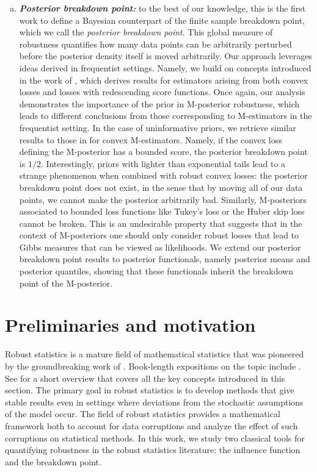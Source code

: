 \documentclass[11pt, oneside]{amsart}
\theoremstyle{definition}   %
\begin{document}
\begin{enumerate}[(a)]
%
    \item 
\textbf{\emph{Posterior breakdown point:}} to the best of our knowledge, this is the first work to define a Bayesian counterpart of the finite sample breakdown point, which we call the \emph{posterior breakdown point}.  This global  measure of robustness quantifies how many data points can be arbitrarily perturbed before the posterior density itself is moved arbitrarily.  Our approach leverages ideas derived in frequentist settings.  Namely, we build on concepts introduced in the work of \cite{huber1984}, which derives results for estimators arising from both convex losses and losses with redescending score functions.  
Once again, our analysis demonstrates the importance of the prior in M-posterior robustness, which leads to different conclusions from those  corresponding to M-estimators in the frequentist setting.  In the case of uninformative priors, we retrieve similar results to those in \cite{donoho:huber1983} for convex M-estimators.  Namely, if the convex loss defining the M-posterior has a bounded score, the posterior breakdown point is $1/2$.   Interestingly, priors with lighter than exponential tails lead to a strange phenomenon when combined with robust convex losses: the posterior breakdown point does not exist, in the sense that by moving all of our data points, we cannot make the posterior arbitrarily bad. Similarly, M-posteriors associated to bounded loss functions like Tukey's loss or the Huber skip loss cannot be broken. This is an undesirable property that suggests that in the context of M-posteriors one should only consider robust losses that lead to Gibbs measures that can be viewed as likelihoods. 
We extend our posterior breakdown point results to posterior functionals, namely posterior means and posterior quantiles, showing that these functionals inherit the breakdown point of the M-posterior.
\end{enumerate}


\section{Preliminaries and motivation}
%
\label{sec:robust_statistics}

Robust statistics is a mature field of mathematical statistics that was pioneered by the groundbreaking work of \cite{huber1964,hampel1968}. Book-length expositions on the topic include \citep{huber1981, huber:ronchetti2009, hampeletal1986, maronnaetal2019}. See \cite{avellamedina:ronchetti2015} for a short overview that covers all the key concepts introduced in this section.  The primary goal in  robust statistics is to develop methods that give stable results even in settings where deviations from the stochastic assumptions of the model occur.
The field of robust statistics provides  a mathematical framework both to account for data corruptions and analyze the effect of such corruptions on statistical methods.  In this work, we study two classical tools for quantifying robustness in the robust statistics literature: the influence function and the breakdown point.
\end{document}
